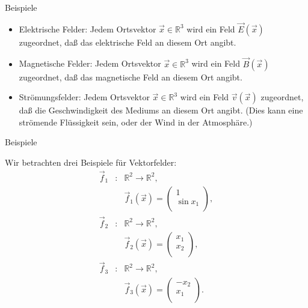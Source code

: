 \documentclass[german]{beamer}
\newcommand{\bq}{\begin{eqnarray*}}
\newcommand{\eq}{\end{eqnarray*}}
\begin{document}
\begin{frame}{Beispiele}

\begin{itemize}
\item \alert{Elektrische Felder}: Jedem Ortsvektor $\vec{x} \in {\mathbb R}^3$ wird ein Feld $\vec{E}(\vec{x})$ zugeordnet, da{\ss} das elektrische Feld
an diesem Ort angibt.

\vspace*{3mm}
\item \alert{Magnetische Felder}: Jedem Ortsvektor $\vec{x} \in {\mathbb R}^3$ wird ein Feld $\vec{B}(\vec{x})$ zugeordnet, da{\ss} das magnetische Feld
an diesem Ort angibt.

\vspace*{3mm}
\item \alert{Str\"omungsfelder}: Jedem Ortsvektor $\vec{x} \in {\mathbb R}^3$ wird ein Feld $\vec{v}(\vec{x})$ zugeordnet, da{\ss} die Geschwindigkeit
des Mediums 
an diesem Ort angibt.
(Dies kann eine str\"omende Fl\"ussigkeit sein, oder der Wind in der Atmosph\"are.)
\end{itemize}

\end{frame}

\begin{frame}{Beispiele}

\begin{example}
Wir betrachten drei Beispiele f\"ur Vektorfelder:
\bq 
 \vec{f}_1 & : & {\mathbb R}^2 \rightarrow {\mathbb R}^2,
 \nonumber \\
 & & \vec{f}_1(\vec{x}) = \left( \begin{array}{c} 1 \\ \sin x_1 \\ \end{array} \right),
 \nonumber \\
 \vec{f}_2 & : & {\mathbb R}^2 \rightarrow {\mathbb R}^2,
 \nonumber \\
 & & \vec{f}_2(\vec{x}) = \left( \begin{array}{c} x_1 \\ x_2 \\ \end{array} \right),
 \nonumber \\
 \vec{f}_3 & : & {\mathbb R}^2 \rightarrow {\mathbb R}^2,
 \nonumber \\
 & & \vec{f}_3(\vec{x}) = \left( \begin{array}{c} -x_2 \\ x_1 \\ \end{array} \right).
\eq
\end{example}

\end{frame}
\end{document}
